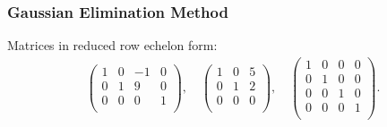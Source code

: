 \begin{frame}
  \frametitle{Gaussian Elimination Method}
  \begin{presentation_example}
    Matrices in reduced row echelon form:
    \begin{align*}
      \begin{pmatrix}
        1 & 0 & -1 & 0\\
        0 & 1 & 9 & 0\\
        0 & 0 & 0 & 1\\
      \end{pmatrix},\quad
      \begin{pmatrix}
        1 & 0 & 5\\
        0 & 1 & 2\\
        0 & 0 & 0 \\
      \end{pmatrix},\quad
      \begin{pmatrix}
        1 & 0 & 0 & 0\\
        0 & 1 & 0 & 0\\
        0 & 0 & 1 & 0\\
        0 & 0 & 0 & 1\\
      \end{pmatrix}.
    \end{align*}
  \end{presentation_example}
\end{frame}

